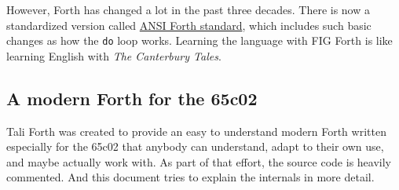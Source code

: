However, Forth has changed a lot in the past three decades. There is now a
standardized version called \href{https://forth-standard.org/}{ANSI Forth
standard}, which includes such basic changes as how the
\texttt{do} loop works. Learning the language with FIG Forth is like learning
English with \textit{The Canterbury Tales}.


\subsection{A modern Forth for the 65c02}

Tali Forth was created to provide an easy to understand modern Forth written
especially for the 65c02 that anybody can understand, adapt to their own use,
and maybe actually work with. As part of that effort, the source code is heavily
commented. And this document tries to explain the internals in more detail.

